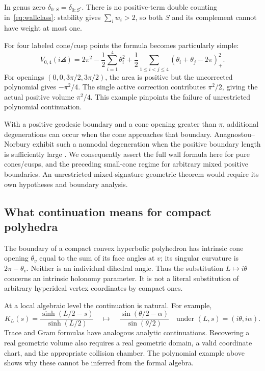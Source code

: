 In genus zero $\delta_{0:S}=\delta_{0:S^c}$. There is no positive-term
double counting in~\eqref{eq:wallclass}: stability gives $\sum_iw_i>2$,
so both $S$ and its complement cannot have weight at most one.

For four labeled cone/cusp points the formula becomes particularly simple:
\begin{equation}
 \boxed{
 V_{0,4}(i\angles)=2\pi^2-\frac12\sum_{i=1}^4\theta_i^2
 +\frac12\sum_{1\le i<j\le4}(\theta_i+\theta_j-2\pi)_+^2.}
 \label{eq:conev04}
\end{equation}
For openings $(0,0,3\pi/2,3\pi/2)$, the area is positive but the uncorrected
polynomial gives $-\pi^2/4$. The single active correction contributes
$\pi^2/2$, giving the actual positive volume $\pi^2/4$. This example
pinpoints the failure of unrestricted polynomial continuation.

With a positive geodesic boundary and a cone opening greater than $\pi$,
additional degenerations can occur when the cone approaches that boundary.
Anagnostou--Norbury exhibit such a nonnodal degeneration
when the positive boundary length is sufficiently large
\cite[Lemma 2.10]{AnagnostouNorbury}. We consequently assert the full
wall formula here for pure cones/cusps, and the preceding small-cone regime
for arbitrary mixed positive boundaries. An unrestricted mixed-signature
geometric theorem would require its own hypotheses and boundary analysis.

\subsection{What continuation means for compact polyhedra}

The boundary of a compact convex hyperbolic polyhedron has intrinsic cone
opening $\theta_v$ equal to the sum of its face angles at $v$; its singular
curvature is $2\pi-\theta_v$. Neither is an individual dihedral angle.
Thus the substitution $L\mapsto i\theta$ concerns an intrinsic holonomy
parameter. It is not a literal substitution of arbitrary hyperideal vertex
coordinates by compact ones.

At a local algebraic level the continuation is natural. For example,
\begin{equation}
 K_L(s)=\frac{\sinh(L/2-s)}{\sinh(L/2)}
 \quad\longmapsto\quad
 \frac{\sin(\theta/2-\alpha)}{\sin(\theta/2)}
 \quad\text{under }(L,s)=(i\theta,i\alpha).
 \label{eq:kernelcontinuation}
\end{equation}
Trace and Gram formulas have analogous analytic continuations. Recovering
a real geometric volume also requires a real geometric domain, a valid
coordinate chart, and the appropriate collision chamber. The polynomial
example above shows why these cannot be inferred from the formal algebra.

